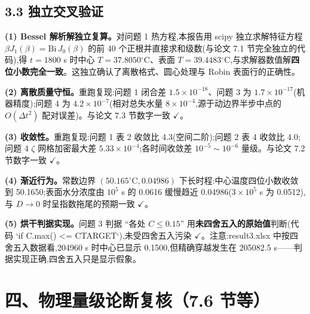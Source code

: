\documentclass[12pt,a4paper]{ctexart}
\newcommand{\ok}{$\checkmark$}
\newcommand{\dg}{\ensuremath{^\circ}}
\begin{document}
\subsection{3.3 独立交叉验证}

\textbf{(1) Bessel 解析解独立复算。}对问题 1 热方程,本报告用 scipy 独立求解特征方程 $\beta J_1(\beta)=\mathrm{Bi}\,J_0(\beta)$ 的前 40 个正根并直接求和级数(与论文 7.1 节完全独立的代码),得 $t=1800$ s 时中心 $T=37.8050\dg$C、表面 $T=39.4483\dg$C,与求解器数值解\textbf{四位小数完全一致}。这独立确认了离散格式、圆心处理与 Robin 表面行的正确性。

\textbf{(2) 离散质量守恒。}重跑复现:问题 1 闭合差 $1.5\times10^{-18}$、问题 3 为 $1.7\times10^{-17}$(机器精度);问题 4 为 $4.2\times10^{-7}$(相对总失水量 $8\times10^{-4}$,源于动边界半步中点的 $O(\Delta t^2)$ 配对误差)。与论文 7.3 节数字一致 \ok。

\textbf{(3) 收敛性。}重跑复现:问题 1 表 2 收敛比 4.3(空间二阶);问题 2 表 4 收敛比 4.0;问题 4 $\zeta$ 网格加密最大差 $5.33\times10^{-4}$;各时间收敛差 $10^{-5}\sim10^{-6}$ 量级。与论文 7.2 节数字一致 \ok。

\textbf{(4) 渐近行为。}常数边界 $(50.165\dg\mathrm{C},0.04986)$ 下长时程:中心温度四位小数收敛到 50.1650;表面水分浓度由 $10^5$ s 的 0.0616 缓慢趋近 0.04986($3\times10^5$ s 为 0.0512),与 $D\to0$ 时呈指数拖尾的预期一致 \ok。

\textbf{(5) 烘干判据实现。}问题 3 判据 ``各处 $C\le0.15$'' 用\textbf{未四舍五入的原始值}判断(代码 `if C.max() <= CTARGET`),未受四舍五入污染 \ok。注意:result3.xlsx 中按四舍五入数据看,204960 s 时中心已显示 0.1500,但精确穿越发生在 205082.5 s——判据实现正确,四舍五入只是显示假象。

\section{四、物理量级论断复核（7.6 节等）}
\end{document}
